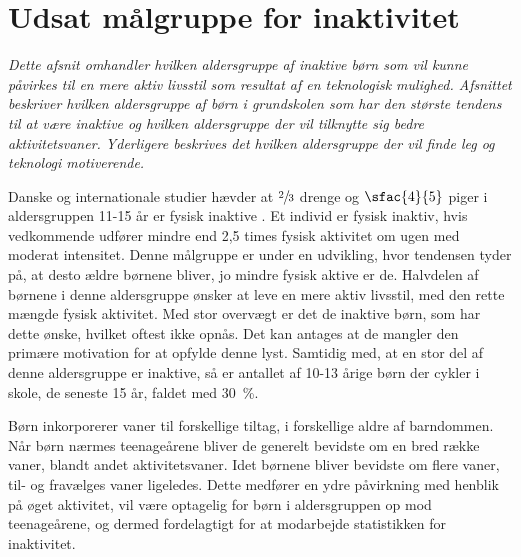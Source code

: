 \section {Udsat målgruppe for inaktivitet}
\textit{Dette afsnit omhandler hvilken aldersgruppe af inaktive børn som vil kunne påvirkes til en mere aktiv livsstil som resultat af en teknologisk mulighed. Afsnittet beskriver hvilken aldersgruppe af børn i grundskolen som har den største tendens til at være inaktive og hvilken aldersgruppe der vil tilknytte sig bedre aktivitetsvaner. Yderligere beskrives det hvilken aldersgruppe der vil finde leg og teknologi motiverende.}
				
Danske og internationale studier hævder at $\sfrac{2}{3}$ drenge og $\sfac{4}{5}$ piger i aldersgruppen 11-15 år er fysisk inaktive \citep{SundhedsstyrrelsenFaktaark}. Et individ er fysisk inaktiv, hvis vedkommende udfører mindre end 2,5 times fysisk aktivitet om ugen med moderat intensitet. \citep{Kiens2007}
Denne målgruppe er under en udvikling, hvor tendensen tyder på, at desto ældre børnene bliver, jo mindre fysisk aktive er de. Halvdelen af børnene i denne aldersgruppe ønsker at leve en mere aktiv livsstil, med den rette mængde fysisk aktivitet. Med stor overvægt er det de inaktive børn, som har dette ønske, hvilket oftest ikke opnås. Det kan antages at de mangler den primære motivation for at opfylde denne lyst. Samtidig med, at en stor del af denne aldersgruppe er inaktive, så er antallet af 10-13 årige børn der cykler i skole, de seneste 15 år, faldet med 30~\%. \citep{Sundhedsstyrelsen2006}

Børn inkorporerer vaner til forskellige tiltag, i forskellige aldre af barndommen. Når børn nærmes teenageårene bliver de generelt bevidste om en bred række vaner, blandt andet aktivitetsvaner. Idet børnene bliver bevidste om flere vaner, til- og fravælges vaner ligeledes. Dette medfører en ydre påvirkning med henblik på øget aktivitet, vil være optagelig for børn i aldersgruppen op mod teenageårene, og dermed fordelagtigt for at modarbejde statistikken for inaktivitet. \citep{Laub2011} 

